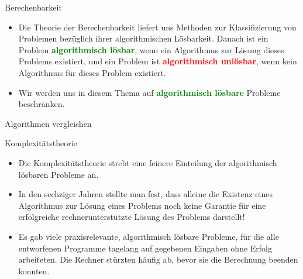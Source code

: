 
\begin{frame}{Berechenbarkeit}
	\begin{itemize}[<+->]
		\item Die Theorie der Berechenbarkeit liefert uns Methoden zur Klassifizierung von Problemen bezüglich ihrer algorithmischen Lösbarkeit. Danach ist ein Problem \textbf{\textcolor{Green}{algorithmisch
				      lösbar}}, wenn ein Algorithmus zur Lösung dieses Problems existiert, und ein Problem ist
		      \textbf{\textcolor{Red}{algorithmisch unlösbar}}, wenn kein Algorithmus für dieses Problem existiert.
		\item Wir werden uns in diesem Thema auf \textbf{\textcolor{Green}{algorithmisch lösbare}} Probleme beschränken.
	\end{itemize}
\end{frame}

\begin{frame}{Algorithmen vergleichen}
    

    
\end{frame}

\begin{frame}{Komplexitätstheorie}
	\begin{itemize}[<+->]
		\item Die Komplexitätstheorie strebt eine feinere Einteilung der algorithmisch lösbaren Probleme an.
		\item In den sechziger Jahren stellte man fest, dass alleine die Existenz eines Algorithmus zur Lösung eines Problems noch keine Garantie für eine
		      erfolgreiche rechnerunterstützte Lösung des Problems darstellt!
		\item Es gab viele praxisrelevante, algorithmisch lösbare Probleme, für die alle entworfenen Programme tagelang auf gegebenen Eingaben ohne Erfolg arbeiteten. Die Rechner stürzten häufig ab, bevor sie die Berechnung beenden konnten.
	\end{itemize}
\end{frame}

